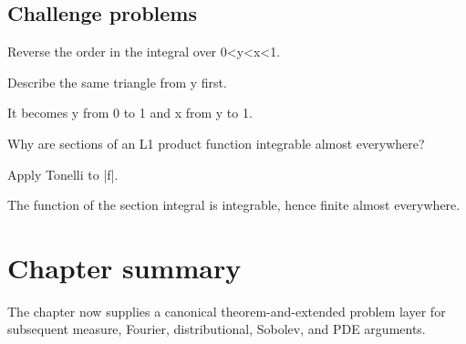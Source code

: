 \subsection*{Challenge problems}

\begin{exercise}\label{exr:iii05-expand-15}
Reverse the order in the integral over 0<y<x<1.
\end{exercise}
\begin{hint}
Describe the same triangle from y first.
\end{hint}
\begin{solution}
It becomes y from 0 to 1 and x from y to 1.
\end{solution}

\begin{exercise}\label{exr:iii05-expand-16}
Why are sections of an L1 product function integrable almost everywhere?
\end{exercise}
\begin{hint}
Apply Tonelli to |f|.
\end{hint}
\begin{solution}
The function of the section integral is integrable, hence finite almost everywhere.
\end{solution}
\section*{Chapter summary}
The chapter now supplies a canonical theorem-and-extended problem layer for subsequent measure, Fourier, distributional, Sobolev, and PDE arguments.
